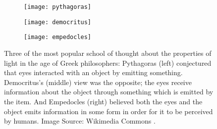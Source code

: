 \begin{figure}
\begin{subfigure}{.3\textwidth}
  \centering
  \texttt{[image: pythagoras]}
  \label{fig:pythagoras}
\end{subfigure}%
\begin{subfigure}{.3\textwidth}
  \centering
  \texttt{[image: democritus]}
  \label{fig:democritus}
\end{subfigure}
\begin{subfigure}{.3\textwidth}
  \centering
  \texttt{[image: empedocles]}
  \label{fig:empedocles}
\end{subfigure}%
\caption{Three of the most popular school of thought about the properties of light in the age of Greek philosophers: Pythagoras (left) conjectured that eyes interacted with an object by emitting something.  Democritus's (middle) view was the opposite; the eyes receive information about the object through something which is emitted by the item. And Empedocles (right) believed both the eyes and the object emits information in some form in order for it to be perceived by humans. Image Source: Wikimedia Commons \cite{empedocles_pic}.}
\label{fig:early_hypothesis}
\end{figure}

